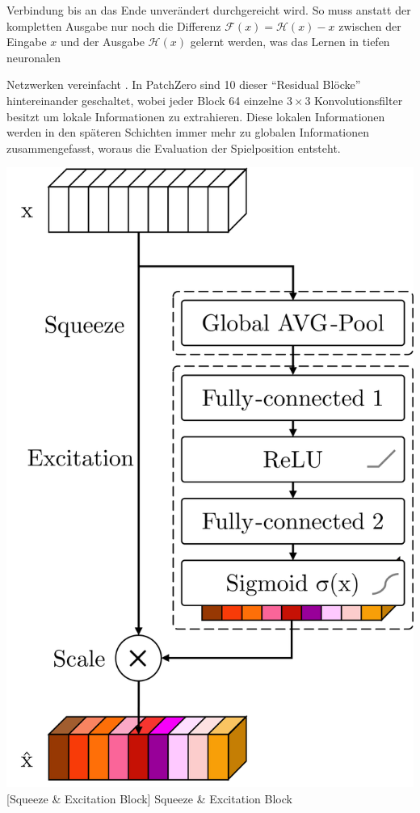 \begin{minipage}{0.67\textwidth}
    \begin{addmargin}[144.866113pt]{0em}
        Verbindung bis an das Ende unverändert durchgereicht wird. So muss anstatt der kompletten Ausgabe nur noch die Differenz $\mathcal{F}\left(x\right) = \mathcal{H}\left(x\right) - x$ zwischen der Eingabe $x$ und der Ausgabe $\mathcal{H}\left(x\right)$ gelernt werden, was das Lernen in tiefen neuronalen
    \end{addmargin}
    Netzwerken vereinfacht \cite[S. 3]{2015.ResNet}. In PatchZero sind 10 dieser \enquote{Residual Blöcke} hintereinander geschaltet, wobei jeder Block 64 einzelne $3\times 3$ Konvolutionsfilter besitzt um lokale Informationen zu extrahieren. Diese lokalen Informationen werden in den späteren Schichten immer mehr zu globalen Informationen zusammengefasst, woraus die Evaluation der Spielposition entsteht.
\end{minipage}
\begin{minipage}{0.33\textwidth}
    \centering
    \captionsetup{type=figure}
    \includegraphics[width=0.95\linewidth]{res/pictures/squeeze-and-excitation-block.pdf}
    [Squeeze \& Excitation Block]{\unskip}\label{fig:squeeze-and-excitation-block}
    Squeeze \& Excitation Block
\end{minipage}


